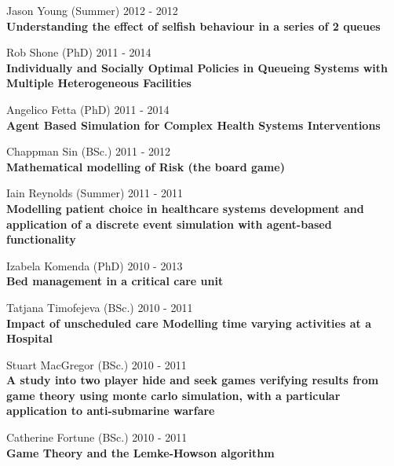 \documentclass[10pt]{res} %
\begin{document}
\begin{resume}
\begin{etaremune}
\item
    Jason Young (Summer) \hfill 2012 -
    2012\\
\textbf{Understanding the effect of selfish behaviour in a series of 2 queues}\\

\item
    Rob Shone (PhD) \hfill 2011 -
    2014\\
\textbf{Individually and Socially Optimal Policies in Queueing Systems with Multiple Heterogeneous Facilities}\\

\item
    Angelico Fetta (PhD) \hfill 2011 -
    2014\\
\textbf{Agent Based Simulation for Complex Health Systems Interventions}\\

\item
    Chappman Sin (BSc.) \hfill 2011 -
    2012\\
\textbf{Mathematical modelling of Risk (the board game)}\\

\item
    Iain Reynolds (Summer) \hfill 2011 -
    2011\\
\textbf{Modelling patient choice in healthcare systems development and application of a discrete event simulation with agent-based functionality}\\

\item
    Izabela Komenda (PhD) \hfill 2010 -
    2013\\
\textbf{Bed management in a critical care unit}\\

\item
    Tatjana Timofejeva (BSc.) \hfill 2010 -
    2011\\
\textbf{Impact of unscheduled care Modelling time varying activities at a Hospital}\\

\item
    Stuart MacGregor (BSc.) \hfill 2010 -
    2011\\
\textbf{A study into two player hide and seek games verifying results from game theory using monte carlo simulation, with a particular application to anti-submarine warfare}\\

\item
    Catherine Fortune (BSc.) \hfill 2010 -
    2011\\
\textbf{Game Theory and the Lemke-Howson algorithm}\\


\end{etaremune}
\end{resume}
\end{document}

